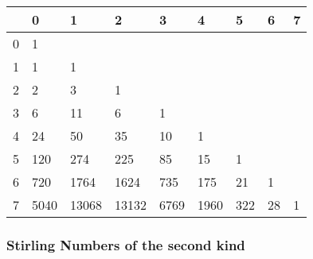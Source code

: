 \begin{center}
	\begin{tabular}{ |l||l|l|l|l|l|l|l|l| } 
		\hline
		\diagbox{$n$}{$k$} & 0 & 1 & 2 & 3 & 4 & 5 & 6 & 7  \\
		\hline\hline
		0 &  1    &       &       &      &      &     &     &  \\
		1 &  1    & 1     &       &      &      &     &     &  \\
		2 &  2    & 3     & 1     &      &      &     &     &  \\
		3 &  6    & 11    & 6     & 1    &      &     &     &  \\
		4 &  24   & 50    & 35    & 10   & 1    &     &     &  \\
		5 &  120  & 274   & 225   & 85   & 15   & 1   &     &  \\
		6 &  720  & 1764  & 1624  & 735  & 175  & 21  & 1   &  \\
		7 &  5040 & 13068 & 13132 & 6769 & 1960 & 322 & 28 & 1 \\
		\hline
	\end{tabular}
\end{center}

\subsubsection{Stirling Numbers of the second kind}

